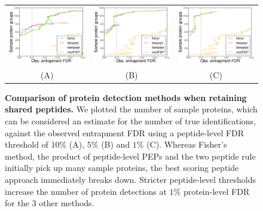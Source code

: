 \documentclass{article}
\begin{document}
\begin{figure}
\begin{center}
\begin{tabular}{ccc} 
\includegraphics[width=0.3\linewidth]
  {./img/shared-pept-performance-fdr10} &
\includegraphics[width=0.3\linewidth]
  {./img/shared-pept-performance-fdr5} &
\includegraphics[width=0.3\linewidth]
  {./img/shared-pept-performance-fdr1}\\
(A) & (B) & (C)
\end{tabular}
\caption{\label{fig:shared-performance}\textbf{Comparison of protein 
detection methods when retaining shared peptides.} We plotted the 
number of sample proteins, which can be considered an estimate for the 
number of true identifications, against the observed entrapment FDR 
using a peptide-level FDR threshold of $10\%$ (A), $5\%$ (B) and $1\%$ 
(C). Whereas Fisher's method, the product of peptide-level PEPs and 
the two peptide rule initially pick up many sample proteins, the best 
scoring peptide approach immediately breaks down. Stricter 
peptide-level thresholds increase the number of protein detections at 
$1\%$ protein-level FDR for the $3$ other methods.}
\end{center}
\end{figure}
\end{document}
